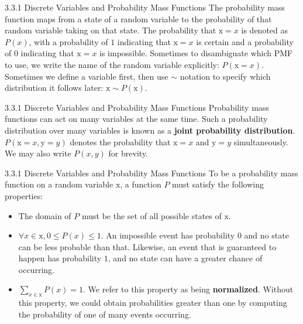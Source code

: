 \begin{frame}{3.3.1 Discrete Variables and Probability Mass Functions}
    \justifying
    The probability mass function maps from a state of a random variable to the probability of that random variable taking on that state. The probability that $\mathrm{x} = x$ is denoted as $P(x)$, with a probability of $1$ indicating that $\mathrm{x} = x$ is certain and a probability of $0$ indicating that $\mathrm{x} = x$ is impossible. Sometimes to disambiguate which PMF to use, we write the name of the random variable explicitly: $P(\mathrm{x} = x)$. Sometimes we define a variable first, then use $\sim$ notation to specify which distribution it follows later: $\mathrm{x} \sim P(\mathrm{x})$.
\end{frame}

\begin{frame}{3.3.1 Discrete Variables and Probability Mass Functions}
    \justifying
    Probability mass functions can act on many variables at the same time. Such a probability distribution over many variables is known as a \textbf{joint probability distribution}. $P(\mathrm{x} = x, \mathrm{y} = y)$ denotes the probability that $\mathrm{x} = x$ and $\mathrm{y} =y$ simultaneously. We may also write $P(x, y)$ for brevity.
\end{frame}

\begin{frame}{3.3.1 Discrete Variables and Probability Mass Functions}
    \justifying
    To be a probability mass function on a random variable $\mathrm{x}$, a function $P$ must satisfy the following properties:
    \begin{itemize}
        \justifying
        \item The domain of $P$ must be the set of all possible states of $\mathrm{x}$.
        \item $\forall x \in \mathrm{x}, 0 \leq P(x) \leq 1$. An impossible event has probability $0$ and no state can be less probable than that. Likewise, an event that is guaranteed to happen has probability $1$, and no state can have a greater chance of occurring.
        \item $\sum_{x \in \mathrm{x}} P(x) = 1$. We refer to this property as being \textbf{normalized}. Without this property, we could obtain probabilities greater than one by computing the probability of one of many events occurring.
    \end{itemize}{}
\end{frame}

